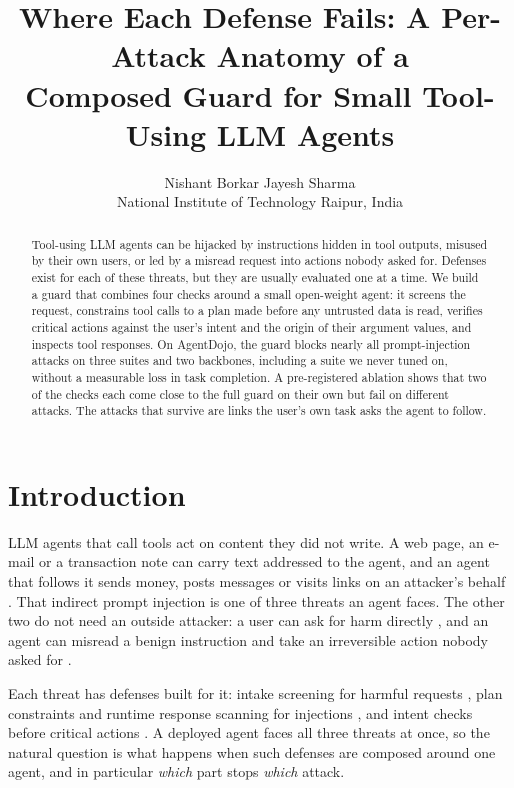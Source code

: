 \documentclass[11pt]{article}
\title{Where Each Defense Fails: A Per-Attack Anatomy of a\\Composed Guard for Small Tool-Using LLM Agents}
\author{Nishant Borkar \quad Jayesh Sharma \\
  National Institute of Technology Raipur, India}
\begin{document}
\maketitle

\begin{abstract}
Tool-using LLM agents can be hijacked by instructions hidden in tool outputs, misused by their own users, or led by a misread request into actions nobody asked for. Defenses exist for each of these threats, but they are usually evaluated one at a time. We build a guard that combines four checks around a small open-weight agent: it screens the request, constrains tool calls to a plan made before any untrusted data is read, verifies critical actions against the user's intent and the origin of their argument values, and inspects tool responses. On AgentDojo, the guard blocks nearly all prompt-injection attacks on three suites and two backbones, including a suite we never tuned on, without a measurable loss in task completion. A pre-registered ablation shows that two of the checks each come close to the full guard on their own but fail on different attacks. The attacks that survive are links the user's own task asks the agent to follow.
\end{abstract}

\section{Introduction}
\label{sec:intro}

LLM agents that call tools act on content they did not write. A web page, an e-mail or a transaction note can carry text addressed to the agent, and an agent that follows it sends money, posts messages or visits links on an attacker's behalf \citep{greshake2023indirect,debenedetti2024agentdojo}. That indirect prompt injection is one of three threats an agent faces. The other two do not need an outside attacker: a user can ask for harm directly \citep{andriushchenko2025agentharm}, and an agent can misread a benign instruction and take an irreversible action nobody asked for \citep{fang2025inferact}.

Each threat has defenses built for it: intake screening for harmful requests \citep{andriushchenko2025agentharm}, plan constraints and runtime response scanning for injections \citep{an2025ipiguard,yergattikar2026shieldmcp}, and intent checks before critical actions \citep{fang2025inferact}. A deployed agent faces all three threats at once, so the natural question is what happens when such defenses are composed around one agent, and in particular \emph{which} part stops \emph{which} attack.
\end{document}
